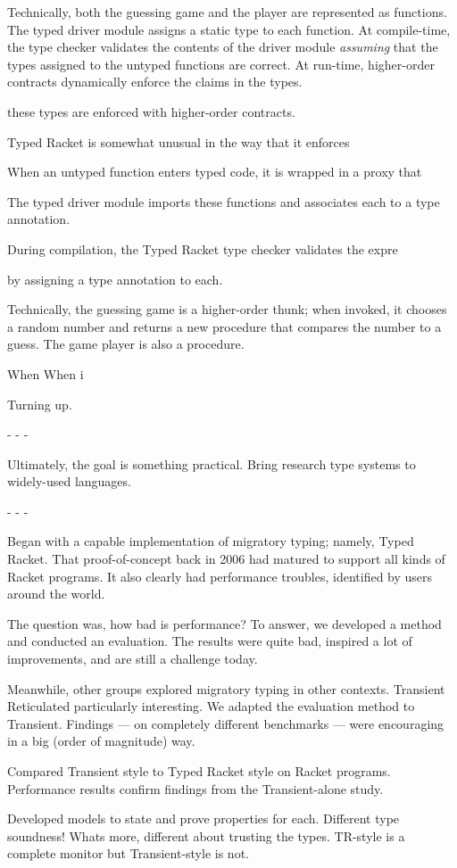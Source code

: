 Technically, both the guessing game and the player are represented as functions.
The typed driver module assigns a static type to each function.
At compile-time, the type checker validates the contents of the driver module
\emph{assuming}\/ that the types assigned to the untyped functions are correct.
At run-time, higher-order contracts dynamically enforce the claims in the types.

these types are enforced with higher-order contracts.

Typed Racket is somewhat unusual in the way that it enforces


When an untyped function enters typed code, it is wrapped in a proxy that 

The typed driver module imports these functions and associates each to a type
annotation.


During compilation, the Typed Racket type checker validates the expre

by assigning a type
annotation to each.

Technically, the guessing game is a higher-order thunk; when invoked, it
chooses a random number and returns a new procedure that compares the number
to a guess.
The game player is also a procedure.


When
When i

Turning up.

%
%
%
%
%
%
%
%
%
%
%

- - -

Ultimately, the goal is something practical.
Bring research type systems to widely-used languages.

- - -

Began with a capable implementation of migratory typing; namely, Typed Racket.
That proof-of-concept back in 2006 had matured to support all kinds of Racket programs.
It also clearly had performance troubles, identified by users around the world.

The question was, how bad is performance?
To answer, we developed a method and conducted an evaluation.
The results were quite bad, inspired a lot of improvements, and are still a challenge today.

Meanwhile, other groups explored migratory typing in other contexts.
Transient Reticulated particularly interesting.
We adapted the evaluation method to Transient.
Findings --- on completely different benchmarks --- were encouraging in a big (order of magnitude) way.

Compared Transient style to Typed Racket style on Racket programs.
Performance results confirm findings from the Transient-alone study.

Developed models to state and prove properties for each.
Different type soundness!
Whats more, different about trusting the types.
TR-style is a complete monitor but Transient-style is not.


